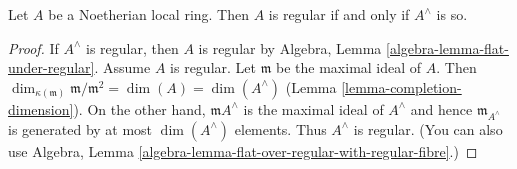 \begin{lemma}
\label{lemma-completion-regular}
Let $A$ be a Noetherian local ring.
Then $A$ is regular if and only if $A^\wedge$ is so.
\end{lemma}

\begin{proof}
If $A^\wedge$ is regular, then $A$ is regular by
Algebra, Lemma \ref{algebra-lemma-flat-under-regular}.
Assume $A$ is regular. Let $\mathfrak m$ be the maximal ideal
of $A$. Then $\dim_{\kappa(\mathfrak m)} \mathfrak m/\mathfrak m^2 =
\dim(A) = \dim(A^\wedge)$ (Lemma \ref{lemma-completion-dimension}).
On the other hand, $\mathfrak mA^\wedge$ is the maximal ideal of
$A^\wedge$ and hence $\mathfrak m_{A^\wedge}$
is generated by at most $\dim(A^\wedge)$ elements. Thus $A^\wedge$ is regular.
(You can also use
Algebra, Lemma \ref{algebra-lemma-flat-over-regular-with-regular-fibre}.)
\end{proof}
